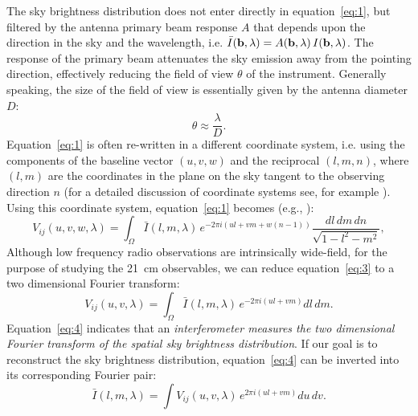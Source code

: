The sky brightness distribution does not enter directly in equation~\ref{eq:1}, but filtered by the antenna primary beam response $A$ that depends upon the direction in the sky and the wavelength, i.e. ${\bar I} ({\bf b}, \lambda) = A ({\bf b}, \lambda)  \, I ({\bf b}, \lambda)$. The response of the primary beam attenuates the sky emission away from the pointing direction, effectively reducing the field of view $\theta$ of the instrument. Generally speaking, the size of the field of view is essentially given by the antenna diameter $D$: 
\begin{equation}
\theta \approx \frac{\lambda}{D}.
\label{eq:2}
\end{equation}
Equation~\ref{eq:1} is often re-written in a different coordinate system, i.e. using the components of the baseline vector $(u,v,w)$ and the reciprocal $(l,m,n)$, where $(l,m)$ are the coordinates in the plane on the sky tangent to the observing direction $n$ (for a detailed discussion of coordinate systems see, for example \cite{TMS}). Using this coordinate system, equation~\ref{eq:1} becomes (e.g., \cite{TMS}):
\begin{equation}
V_{ij} (u,v,w, \lambda) = \int_\Omega {\bar I} (l, m, \lambda) \, e^{-2 \pi i (ul + vm + w(n - 1))} \frac {dl \, dm \, dn}{\sqrt{1 - l^2 - m^2}},
\label{eq:3}
\end{equation}
Although low frequency radio observations are intrinsically wide-field, for the purpose of studying the 21~cm observables, we can reduce equation~\ref{eq:3} to a two dimensional Fourier transform:
\begin{equation}
V_{ij} (u,v, \lambda) = \int_\Omega {\bar I} (l, m, \lambda) \, e^{-2 \pi i (ul + vm)} dl \, dm.
\label{eq:4}
\end{equation}
Equation~\ref{eq:4} indicates that an {\it interferometer measures the two dimensional Fourier transform of the spatial sky brightness distribution}. If our goal is to reconstruct the sky brightness distribution, equation~\ref{eq:4} can be inverted into its corresponding Fourier pair:
\begin{equation}
{\bar I} (l, m, \lambda) = \int V_{ij} (u,v, \lambda) \, e^{2 \pi i (ul + vm)} du \, dv.
\label{eq:5}
\end{equation}

